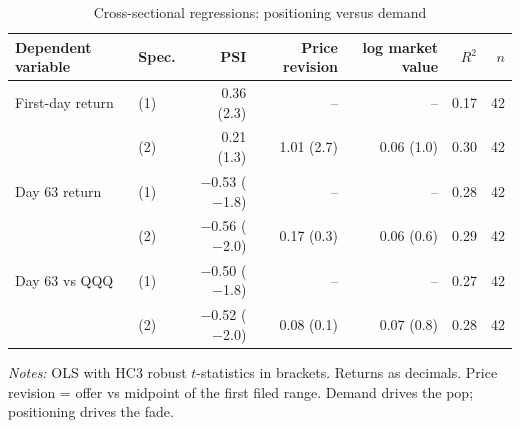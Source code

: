\begin{table}[!htbp]\centering\footnotesize
\caption{Cross-sectional regressions: positioning versus demand}\label{tab:iporeg}

\begin{threeparttable}
\begin{tabular}{llrrrrr}
\toprule
Dependent variable & Spec. & PSI & Price revision & log market value & $R^2$ & $n$ \\
\midrule
First-day return & (1) & 0.36 (2.3) & -- & -- & 0.17 & 42 \\
 & (2) & 0.21 (1.3) & 1.01 (2.7) & 0.06 (1.0) & 0.30 & 42 \\
Day 63 return & (1) & $-$0.53 ($-$1.8) & -- & -- & 0.28 & 42 \\
 & (2) & $-$0.56 ($-$2.0) & 0.17 (0.3) & 0.06 (0.6) & 0.29 & 42 \\
Day 63 vs QQQ & (1) & $-$0.50 ($-$1.8) & -- & -- & 0.27 & 42 \\
 & (2) & $-$0.52 ($-$2.0) & 0.08 (0.1) & 0.07 (0.8) & 0.28 & 42 \\
\bottomrule
\end{tabular}
\begin{tablenotes}[flushleft]\footnotesize
\item \textit{Notes:} OLS with HC3 robust $t$-statistics in brackets. Returns as decimals. Price revision = offer vs midpoint of the first filed range. Demand drives the pop; positioning drives the fade.
\end{tablenotes}
\end{threeparttable}

\end{table}
